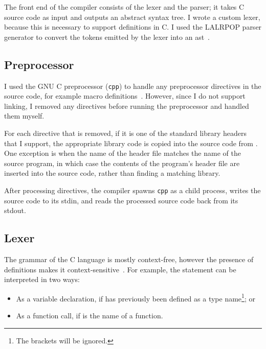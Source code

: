 \documentclass[00-main.tex]{subfiles}
\begin{document}
The front end of the compiler consists of the lexer and the parser; it takes C source code as input and outputs an abstract syntax tree.
I wrote a custom lexer, because this is necessary to support  definitions in C\@.
I used the LALRPOP parser generator to convert the tokens emitted by the lexer into an \gls{ast}~.

\subsection{Preprocessor}

I used the GNU C preprocessor (\texttt{cpp}) to handle any preprocessor directives in the source code, for example macro definitions~.
However, since I do not support linking, I removed any  directives before running the preprocessor and handled them myself.

For each  directive that is removed, if it is one of the standard library headers that I support, the appropriate library code is copied into the source code from .
One exception is when the name of the header file matches the name of the source program, in which case the contents of the program's header file are inserted into the source code, rather than finding a matching library.

After processing  directives, the compiler spawns \texttt{cpp} as a child process, writes the source code to its stdin, and reads the processed source code back from its stdout.

\subsection{Lexer}

The grammar of the C language is mostly context-free, however the presence of  definitions makes it context-sensitive~.
For example, the statement  can be interpreted in two ways:
\begin{itemize}
\item As a variable declaration, if  has previously been defined as a type name\footnote{The brackets will be ignored.}; or
\item As a function call, if  is the name of a function.
\end{itemize}
\end{document}
